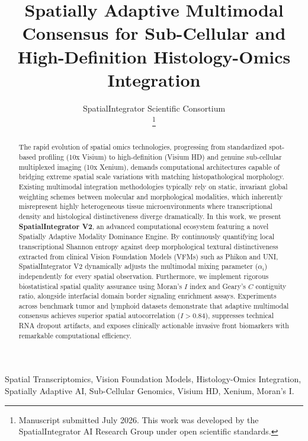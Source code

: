 \documentclass[journal,10pt,twocolumn]{IEEEtran}
\begin{document}
\title{Spatially Adaptive Multimodal Consensus for Sub-Cellular and High-Definition Histology-Omics Integration}

\author{SpatialIntegrator Scientific Consortium\\
\thanks{Manuscript submitted July 2026. This work was developed by the SpatialIntegrator AI Research Group under open scientific standards.}}

\maketitle

\begin{abstract}
The rapid evolution of spatial omics technologies, progressing from standardized spot-based profiling (10x Visium) to high-definition (Visium HD) and genuine sub-cellular multiplexed imaging (10x Xenium), demands computational architectures capable of bridging extreme spatial scale variations with matching histopathological morphology. Existing multimodal integration methodologies typically rely on static, invariant global weighting schemes between molecular and morphological modalities, which inherently misrepresent highly heterogeneous tissue microenvironments where transcriptional density and histological distinctiveness diverge dramatically. In this work, we present \textbf{SpatialIntegrator V2}, an advanced computational ecosystem featuring a novel Spatially Adaptive Modality Dominance Engine. By continuously quantifying local transcriptional Shannon entropy against deep morphological textural distinctiveness extracted from clinical Vision Foundation Models (VFMs) such as Phikon and UNI, SpatialIntegrator V2 dynamically adjusts the multimodal mixing parameter ($\alpha_i$) independently for every spatial observation. Furthermore, we implement rigorous biostatistical spatial quality assurance using Moran's $I$ index and Geary's $C$ contiguity ratio, alongside interfacial domain border signaling enrichment assays. Experiments across benchmark tumor and lymphoid datasets demonstrate that adaptive multimodal consensus achieves superior spatial autocorrelation ($I > 0.84$), suppresses technical RNA dropout artifacts, and exposes clinically actionable invasive front biomarkers with remarkable computational efficiency.
\end{abstract}

\begin{IEEEkeywords}
Spatial Transcriptomics, Vision Foundation Models, Histology-Omics Integration, Spatially Adaptive AI, Sub-Cellular Genomics, Visium HD, Xenium, Moran's I.
\end{IEEEkeywords}
\end{document}
